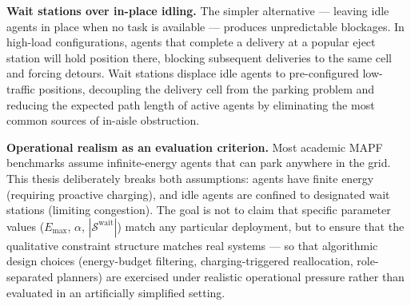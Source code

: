 \textbf{Wait stations over in-place idling.}
The simpler alternative --- leaving idle agents in place when no task is
available --- produces unpredictable blockages.
In high-load configurations, agents that complete a delivery at a popular
eject station will hold position there, blocking subsequent deliveries to the
same cell and forcing detours.
Wait stations displace idle agents to pre-configured low-traffic positions,
decoupling the delivery cell from the parking problem and reducing the
expected path length of active agents by eliminating the most common
sources of in-aisle obstruction.

\textbf{Operational realism as an evaluation criterion.}
Most academic MAPF benchmarks assume infinite-energy agents that can park
anywhere in the grid.
This thesis deliberately breaks both assumptions: agents have finite energy
(requiring proactive charging), and idle agents are confined to designated
wait stations (limiting congestion).
The goal is not to claim that specific parameter values
($E_{\max}$, $\alpha$, $|\mathcal{S}^{\text{wait}}|$) match any particular
deployment, but to ensure that the qualitative constraint structure
matches real systems --- so that algorithmic design choices (energy-budget
filtering, charging-triggered reallocation, role-separated planners)
are exercised under realistic operational pressure rather than evaluated
in an artificially simplified setting.
